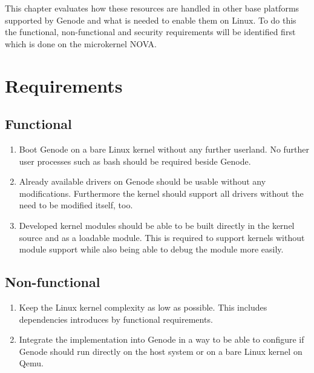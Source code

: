 \documentclass[
a4paper,
12pt,
notitlepage,
parskip=half,
DIV=11,
]{scrbook}
\begin{document}
		This chapter evaluates how these resources are handled in other base platforms supported by Genode and what is needed to enable them on Linux.
		To do this the functional, non-functional and security requirements will be identified first which is done on the microkernel NOVA.
		
		\section{Requirements}
		
		
		
		\subsection{Functional}
		
		\begin{enumerate}
			\item \label{req:boot} Boot Genode on a bare  Linux kernel without any further userland.
			No further user processes such as bash should be required beside Genode.
			\item \label{req:drivers} Already available drivers on Genode should be usable without any modifications.
			Furthermore the kernel should support all drivers without the need to be modified itself, too.
			\item \label{req:modules} Developed kernel modules should be able to be built directly in the kernel source and as a loadable module.
			This is required to support kernels without module support while also being able to debug the module more easily.
		\end{enumerate}
		
		\subsection{Non-functional}
		
		\begin{enumerate}
			\item \label{req:complexity} Keep the Linux kernel complexity as low as possible.
			This includes dependencies introduces by functional requirements.
			\item \label{req:integration} Integrate the implementation into Genode in a way to be able to configure if Genode should run directly on the host system or on a bare Linux kernel on Qemu.
		\end{enumerate}
		
\end{document}
